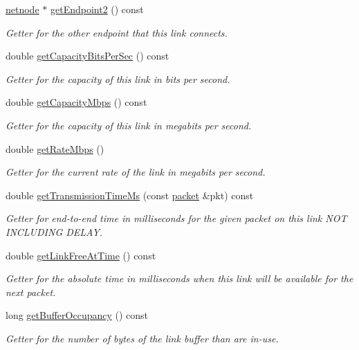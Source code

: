 \begin{DoxyCompactItemize}
\hyperlink{classnetnode}{netnode} $\ast$ \hyperlink{classnetlink_a94e8f2ac142cbf8f4d12ddba641d7f93}{get\-Endpoint2} () const 
\begin{DoxyCompactList}\small\item\em Getter for the other endpoint that this link connects. \end{DoxyCompactList}\item 
double \hyperlink{classnetlink_a67b47d5b1f4318769fa8f04af8496c79}{get\-Capacity\-Bits\-Per\-Sec} () const 
\begin{DoxyCompactList}\small\item\em Getter for the capacity of this link in bits per second. \end{DoxyCompactList}\item 
double \hyperlink{classnetlink_aa8a9e46c022c6be9078b1ffebe0c6083}{get\-Capacity\-Mbps} () const 
\begin{DoxyCompactList}\small\item\em Getter for the capacity of this link in megabits per second. \end{DoxyCompactList}\item 
double \hyperlink{classnetlink_a64822d2a7b2973f9bb3a8207798446d0}{get\-Rate\-Mbps} ()
\begin{DoxyCompactList}\small\item\em Getter for the current rate of the link in megabits per second. \end{DoxyCompactList}\item 
double \hyperlink{classnetlink_ae2cc1d19c2418172e5e36efd133deecb}{get\-Transmission\-Time\-Ms} (const \hyperlink{classpacket}{packet} \&pkt) const 
\begin{DoxyCompactList}\small\item\em Getter for end-\/to-\/end time in milliseconds for the given packet on this link N\-O\-T I\-N\-C\-L\-U\-D\-I\-N\-G D\-E\-L\-A\-Y. \end{DoxyCompactList}\item 
double \hyperlink{classnetlink_a20348993ebfa2fec8dbe30009e7d318d}{get\-Link\-Free\-At\-Time} () const 
\begin{DoxyCompactList}\small\item\em Getter for the absolute time in milliseconds when this link will be available for the next packet. \end{DoxyCompactList}\item 
long \hyperlink{classnetlink_a0fd7563496f463d8c044b8bf36a84cd8}{get\-Buffer\-Occupancy} () const 
\begin{DoxyCompactList}\small\item\em Getter for the number of bytes of the link buffer than are in-\/use. \end{DoxyCompactList}\item 

\end{DoxyCompactItemize}
